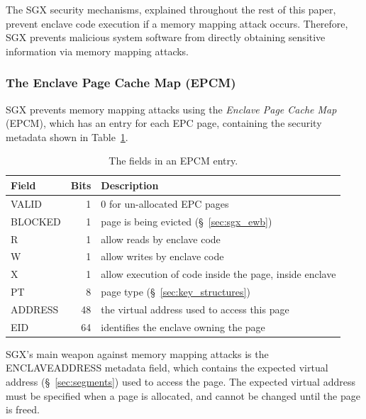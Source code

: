 The SGX security mechanisms, explained throughout the rest of this paper,
prevent enclave code execution if a memory mapping attack occurs. Therefore,
SGX prevents malicious system software from directly obtaining sensitive
information via memory mapping attacks.


\subsubsection{The Enclave Page Cache Map (EPCM)}
\label{sec:epcm}


SGX prevents memory mapping attacks using the \textit{Enclave Page Cache Map}
(EPCM), which has an entry for each EPC page, containing the security metadata
shown in Table~\ref{fig:epcm_entry}.

\begin{table}[hbt]
  \centering
  \begin{tabularx}{\columnwidth}{| l | r | X |}
  \hline
  \textbf{Field} & \textbf{Bits} & \textbf{Description}\\
  \hline
  VALID & 1 & 0 for un-allocated EPC pages \\
  \hline
  BLOCKED & 1 & page is being evicted (\S~\ref{sec:sgx_ewb})\\
  \hline
  R & 1 & allow reads by enclave code\\
  \hline
  W & 1 & allow writes by enclave code\\
  \hline
  X & 1 & allow execution of code inside the page, inside enclave\\
  \hline
  PT & 8 & page type (\S~\ref{sec:key_structures})\\
  \hline
  ADDRESS & 48 & the virtual address used to access this page\\
  \hline
  EID & 64 & identifies the enclave owning the page\\
  \hline
  \end{tabularx}
  \caption{
    The fields in an EPCM entry.
  }
  \label{fig:epcm_entry}
\end{table}


SGX's main weapon against memory mapping attacks is the ENCLAVEADDRESS metadata
field, which contains the expected virtual address (\S~\ref{sec:segments}) used
to access the page. The expected virtual address must be specified when a page
is allocated, and cannot be changed until the page is freed.

